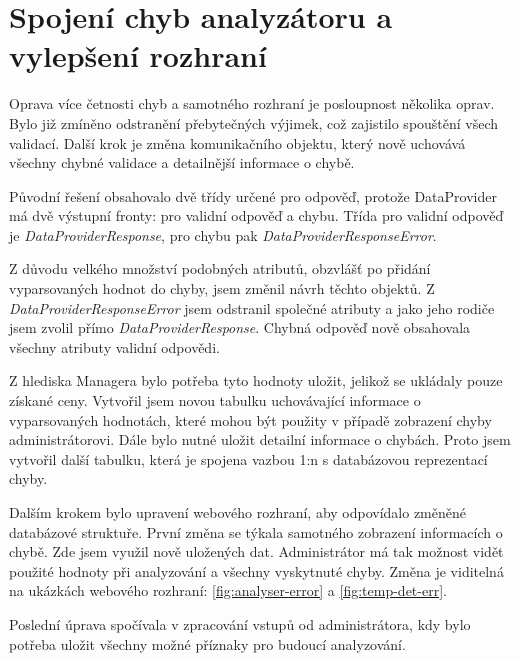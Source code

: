 \documentclass[thesis=B,czech]{FITthesis}[2012/06/26]
\begin{document}
\section{Spojení chyb analyzátoru a vylepšení rozhraní}
Oprava více četnosti chyb a samotného rozhraní je posloupnost několika oprav. 
Bylo již zmíněno odstranění přebytečných výjimek, což zajistilo spouštění všech validací. 
Další krok je změna komunikačního objektu, který nově uchovává všechny chybné validace a detailnější informace
o chybě.
\par
Původní řešení obsahovalo dvě třídy určené pro odpověď, protože DataProvider má dvě výstupní fronty: pro validní odpověď a chybu. 
Třída pro validní odpověď je \textit{DataProviderResponse}, pro chybu pak \textit{DataProviderResponseError}.
\par
Z důvodu velkého množství podobných atributů, obzvlášť po přidání vyparsovaných hodnot do chyby, jsem změnil návrh těchto objektů.
Z \textit{DataProviderResponseError} jsem odstranil společné atributy a jako jeho rodiče jsem zvolil přímo \textit{DataProviderResponse}.
Chybná odpověď nově obsahovala všechny atributy validní odpovědi. 
\par
Z hlediska Managera bylo potřeba tyto hodnoty uložit, jelikož se ukládaly pouze získané ceny. Vytvořil jsem novou tabulku
uchovávající informace o vyparsovaných hodnotách, které mohou být použity v případě zobrazení chyby administrátorovi.
Dále bylo nutné uložit detailní informace o chybách. Proto jsem vytvořil další tabulku, která je spojena vazbou 1:n s databázovou reprezentací chyby.
\par
Dalším krokem bylo upravení webového rozhraní, aby odpovídalo změněné databázové struktuře. První změna se týkala samotného zobrazení
informacích o chybě. Zde jsem využil nově uložených dat. Administrátor má tak možnost vidět použité hodnoty při analyzování a všechny
vyskytnuté chyby. Změna je viditelná na ukázkách webového rozhraní: \ref{fig:analyser-error} a \ref{fig:temp-det-err}.
\par
Poslední úprava spočívala v zpracování vstupů od administrátora, kdy bylo potřeba uložit všechny možné příznaky pro 
budoucí analyzování.
\end{document}
